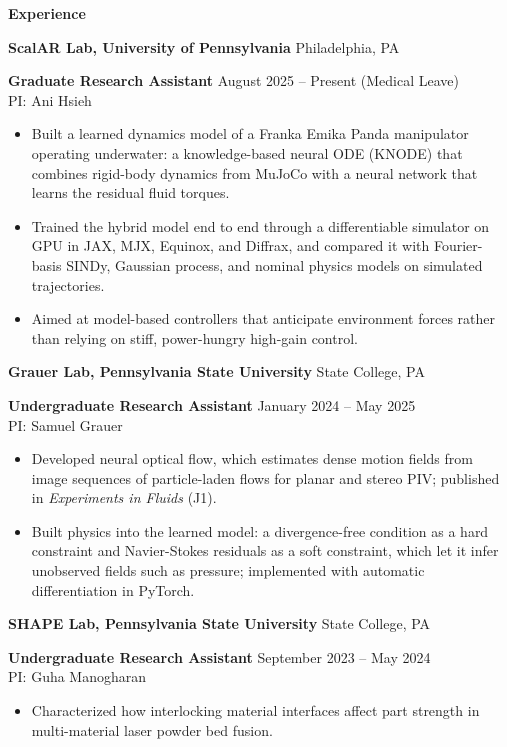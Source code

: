 \begin{center}
    \textbf{Experience}
\end{center}
\textbf{ScalAR Lab, University of Pennsylvania} \hfill Philadelphia, PA

\textbf{Graduate Research Assistant} \hfill August 2025 -- Present (Medical Leave)\\
PI: Ani Hsieh
\begin{itemize}[noitemsep, topsep=0pt, partopsep=0pt, parsep=0pt]
    \item Built a learned dynamics model of a Franka Emika Panda manipulator operating underwater: a knowledge-based neural ODE (KNODE) that combines rigid-body dynamics from MuJoCo with a neural network that learns the residual fluid torques.

    \item Trained the hybrid model end to end through a differentiable simulator on GPU in JAX, MJX, Equinox, and Diffrax, and compared it with Fourier-basis SINDy, Gaussian process, and nominal physics models on simulated trajectories.

    \item Aimed at model-based controllers that anticipate environment forces rather than relying on stiff, power-hungry high-gain control.
\end{itemize}

\vspace{12pt}

\textbf{Grauer Lab, Pennsylvania State University} \hfill State College, PA

\textbf{Undergraduate Research Assistant} \hfill January 2024 -- May 2025\\
PI: Samuel Grauer
\begin{itemize}[noitemsep, topsep=0pt, partopsep=0pt, parsep=0pt]
    \item Developed neural optical flow, which estimates dense motion fields from image sequences of particle-laden flows for planar and stereo PIV; published in \textit{Experiments in Fluids} (J1).

    \item Built physics into the learned model: a divergence-free condition as a hard constraint and Navier-Stokes residuals as a soft constraint, which let it infer unobserved fields such as pressure; implemented with automatic differentiation in PyTorch.
\end{itemize}

\vspace{12pt}

\textbf{SHAPE Lab, Pennsylvania State University} \hfill State College, PA

\textbf{Undergraduate Research Assistant} \hfill September 2023 -- May 2024\\
PI: Guha Manogharan
\begin{itemize}[noitemsep, topsep=0pt, partopsep=0pt, parsep=0pt]
    \item Characterized how interlocking material interfaces affect part strength in multi-material laser powder bed fusion.
\end{itemize}
